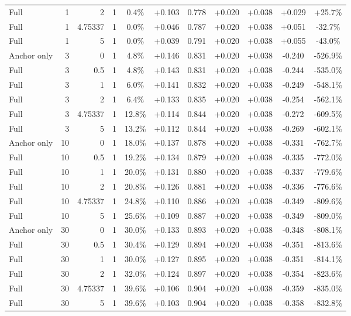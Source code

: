 \begin{table}[htbp]
\begin{tabular}{lrrrccccccc}
Full & 1 & 2 & 1 & 0.4\% & +0.103 & 0.778 & +0.020 & +0.038 & +0.029 & +25.7\% \\
Full & 1 & 4.75337 & 1 & 0.0\% & +0.046 & 0.787 & +0.020 & +0.038 & +0.051 & -32.7\% \\
Full & 1 & 5 & 1 & 0.0\% & +0.039 & 0.791 & +0.020 & +0.038 & +0.055 & -43.0\% \\
Anchor only & 3 & 0 & 1 & 4.8\% & +0.146 & 0.831 & +0.020 & +0.038 & -0.240 & -526.9\% \\
Full & 3 & 0.5 & 1 & 4.8\% & +0.143 & 0.831 & +0.020 & +0.038 & -0.244 & -535.0\% \\
Full & 3 & 1 & 1 & 6.0\% & +0.141 & 0.832 & +0.020 & +0.038 & -0.249 & -548.1\% \\
Full & 3 & 2 & 1 & 6.4\% & +0.133 & 0.835 & +0.020 & +0.038 & -0.254 & -562.1\% \\
Full & 3 & 4.75337 & 1 & 12.8\% & +0.114 & 0.844 & +0.020 & +0.038 & -0.272 & -609.5\% \\
Full & 3 & 5 & 1 & 13.2\% & +0.112 & 0.844 & +0.020 & +0.038 & -0.269 & -602.1\% \\
Anchor only & 10 & 0 & 1 & 18.0\% & +0.137 & 0.878 & +0.020 & +0.038 & -0.331 & -762.7\% \\
Full & 10 & 0.5 & 1 & 19.2\% & +0.134 & 0.879 & +0.020 & +0.038 & -0.335 & -772.0\% \\
Full & 10 & 1 & 1 & 20.0\% & +0.131 & 0.880 & +0.020 & +0.038 & -0.337 & -779.6\% \\
Full & 10 & 2 & 1 & 20.8\% & +0.126 & 0.881 & +0.020 & +0.038 & -0.336 & -776.6\% \\
Full & 10 & 4.75337 & 1 & 24.8\% & +0.110 & 0.886 & +0.020 & +0.038 & -0.349 & -809.6\% \\
Full & 10 & 5 & 1 & 25.6\% & +0.109 & 0.887 & +0.020 & +0.038 & -0.349 & -809.0\% \\
Anchor only & 30 & 0 & 1 & 30.0\% & +0.133 & 0.893 & +0.020 & +0.038 & -0.348 & -808.1\% \\
Full & 30 & 0.5 & 1 & 30.4\% & +0.129 & 0.894 & +0.020 & +0.038 & -0.351 & -813.6\% \\
Full & 30 & 1 & 1 & 30.0\% & +0.127 & 0.895 & +0.020 & +0.038 & -0.351 & -814.1\% \\
Full & 30 & 2 & 1 & 32.0\% & +0.124 & 0.897 & +0.020 & +0.038 & -0.354 & -823.6\% \\
Full & 30 & 4.75337 & 1 & 39.6\% & +0.106 & 0.904 & +0.020 & +0.038 & -0.359 & -835.0\% \\
Full & 30 & 5 & 1 & 39.6\% & +0.103 & 0.904 & +0.020 & +0.038 & -0.358 & -832.8\% \\

\end{tabular}
\end{table}

